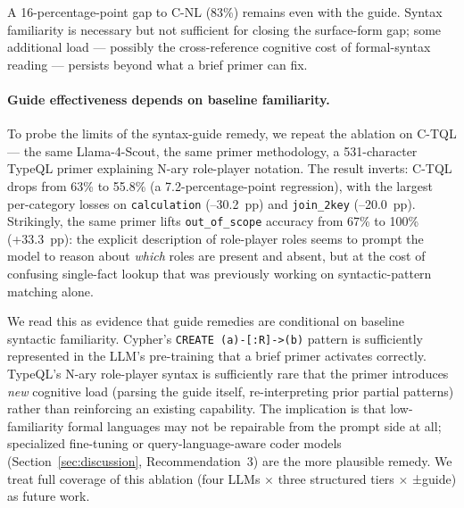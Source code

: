 A 16-percentage-point gap to C-NL (83\%) remains even with the
guide. Syntax familiarity is necessary but not sufficient for closing
the surface-form gap; some additional load — possibly the
cross-reference cognitive cost of formal-syntax reading — persists
beyond what a brief primer can fix.

\paragraph{Guide effectiveness depends on baseline familiarity.}
To probe the limits of the syntax-guide remedy, we repeat the
ablation on C-TQL — the same Llama-4-Scout, the same primer
methodology, a 531-character TypeQL primer explaining N-ary
role-player notation. The result inverts: C-TQL drops from 63\% to
55.8\% (a 7.2-percentage-point regression), with the largest
per-category losses on \texttt{calculation} (--30.2~pp) and
\texttt{join\_2key} (--20.0~pp). Strikingly, the same primer lifts
\texttt{out\_of\_scope} accuracy from 67\% to 100\% (+33.3~pp): the
explicit description of role-player roles seems to prompt the model
to reason about \emph{which} roles are present and absent, but at
the cost of confusing single-fact lookup that was previously working
on syntactic-pattern matching alone.

We read this as evidence that guide remedies are conditional on
baseline syntactic familiarity. Cypher's \texttt{CREATE
(a)-[:R]->(b)} pattern is sufficiently represented in the LLM's
pre-training that a brief primer activates correctly. TypeQL's
N-ary role-player syntax is sufficiently rare that the primer
introduces \emph{new} cognitive load (parsing the guide itself,
re-interpreting prior partial patterns) rather than reinforcing an
existing capability. The implication is that low-familiarity formal
languages may not be repairable from the prompt side at all;
specialized fine-tuning or query-language-aware coder models
(Section~\ref{sec:discussion}, Recommendation~3) are the more
plausible remedy. We treat full coverage of this ablation (four
LLMs $\times$ three structured tiers $\times$ ±guide) as future
work.
